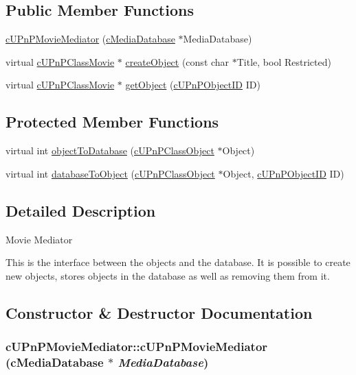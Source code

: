 \subsection*{Public Member Functions}
\begin{CompactItemize}
\item 
\hyperlink{classcUPnPMovieMediator_aa40d0f4054d6b90b2cbb0fe6bd8ac38}{cUPnPMovieMediator} (\hyperlink{classcMediaDatabase}{cMediaDatabase} $\ast$MediaDatabase)
\item 
virtual \hyperlink{classcUPnPClassMovie}{cUPnPClassMovie} $\ast$ \hyperlink{classcUPnPMovieMediator_29d40a311b7283cc4fba36860ac8c935}{createObject} (const char $\ast$Title, bool Restricted)
\item 
virtual \hyperlink{classcUPnPClassMovie}{cUPnPClassMovie} $\ast$ \hyperlink{classcUPnPMovieMediator_d85b240eb54efd9ab46c440b51c71e83}{getObject} (\hyperlink{structcUPnPObjectID}{cUPnPObjectID} ID)
\end{CompactItemize}
\subsection*{Protected Member Functions}
\begin{CompactItemize}
\item 
virtual int \hyperlink{classcUPnPMovieMediator_61ab6dcaf2417898428ddf1f635788b7}{objectToDatabase} (\hyperlink{classcUPnPClassObject}{cUPnPClassObject} $\ast$Object)
\item 
virtual int \hyperlink{classcUPnPMovieMediator_542135e9c1051b57a8f6f5ecc0c1ede3}{databaseToObject} (\hyperlink{classcUPnPClassObject}{cUPnPClassObject} $\ast$Object, \hyperlink{structcUPnPObjectID}{cUPnPObjectID} ID)
\end{CompactItemize}


\subsection{Detailed Description}
Movie Mediator

This is the interface between the objects and the database. It is possible to create new objects, stores objects in the database as well as removing them from it. 

\subsection{Constructor \& Destructor Documentation}
\hypertarget{classcUPnPMovieMediator_aa40d0f4054d6b90b2cbb0fe6bd8ac38}{
\subsubsection[{cUPnPMovieMediator}]{\setlength{\rightskip}{0pt plus 5cm}cUPnPMovieMediator::cUPnPMovieMediator ({\bf cMediaDatabase} $\ast$ {\em MediaDatabase})}}
\label{classcUPnPMovieMediator_aa40d0f4054d6b90b2cbb0fe6bd8ac38}


